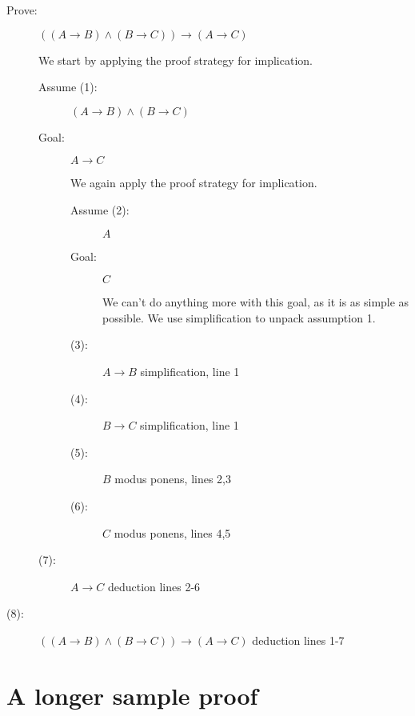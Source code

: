 \documentclass[12pt]{article}
\begin{document}
\begin{description}

\item[Prove:]  $((A \rightarrow B) \wedge (B \rightarrow C)) \rightarrow (A \rightarrow C)$

We start by applying the proof strategy for implication.

\begin{description}

\item[Assume (1):]  $(A \rightarrow B) \wedge (B \rightarrow C)$

\item[Goal:]  $A \rightarrow C$

We again apply the proof strategy for implication.

\begin{description}

\item[Assume (2):]  $A$

\item[Goal:]  $C$

We can't do anything more with this goal, as it is as simple as possible.  We use simplification to unpack assumption 1.

\item[(3):]  $A \rightarrow B$  simplification, line 1

\item[(4):]  $B \rightarrow C$ simplification, line 1

\item[(5):]  $B$ modus ponens, lines 2,3

\item[(6):]  $C$ modus ponens, lines 4,5

\end{description}

\item[(7):]  $A \rightarrow C$  deduction lines 2-6

\end{description}

\item[(8):]  $((A \rightarrow B) \wedge (B \rightarrow C)) \rightarrow (A \rightarrow C)$ deduction lines 1-7

\end{description}

\newpage

\section{A longer sample proof}
\end{document}
